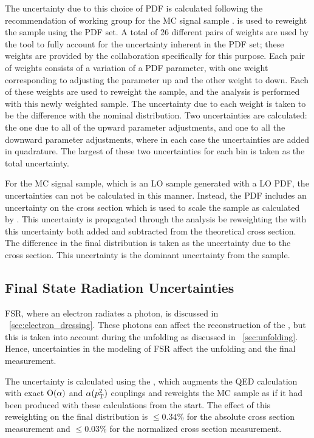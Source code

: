 The uncertainty due to this choice of PDF is calculated following the
recommendation of \PDFforLHC working group for the \POWHEG MC signal sample
\cite{botje_2011}. \PDFWeightProducer is used to reweight the \POWHEG sample
using the \CTten PDF set. A total of \num{26} different pairs of weights are
used by the tool to fully account for the uncertainty inherent in the PDF set;
these weights are provided by the \CTten collaboration specifically for this
purpose. Each pair of weights consists of a variation of a PDF parameter, with
one weight corresponding to adjusting the parameter up and the other weight to
down. Each of these weights are used to reweight the \POWHEG sample, and the
analysis is performed with this newly weighted sample. The uncertainty due to
each weight is taken to be the difference with the nominal \phistar
distribution. Two uncertainties are calculated: the one due to all of the
upward parameter adjustments, and one to all the downward parameter
adjustments, where in each case the uncertainties are added in quadrature. The
largest of these two uncertainties for each \phistar bin is taken as the total
uncertainty.

For the \MADGRAPH MC signal sample, which is an LO sample generated with a LO
PDF, the uncertainties can not be calculated in this manner. Instead, the PDF
includes an uncertainty on the cross section which is used to scale the sample
as calculated by \FEWZ. This uncertainty is propagated through the analysis be
reweighting the \MADGRAPH with this uncertainty both added and subtracted from
the theoretical cross section. The difference in the final \phistar
distribution is taken as the uncertainty due to the \FEWZ cross section. This
uncertainty is the dominant uncertainty from the \MADGRAPH sample.

\subsection{Final State Radiation Uncertainties}
\label{ssec:fsr_uncertainties}

FSR, where an electron radiates a photon, is discussed in
\SEC~\ref{sec:electron_dressing}. These photons can affect the reconstruction
of the \Z, but this is taken into account during the unfolding as discussed in
\SEC~\ref{sec:unfolding}. Hence, uncertainties in the modeling of FSR affect
the unfolding and the final measurement.

The uncertainty is calculated using the \FSRWeightProducer, which augments the
\PYTHIA QED calculation with exact $\operatorname{O}\!\left( \alpha \right)$ and $\alpha(p_{\mathrm{T}}^{2})$
couplings and reweights the MC sample as if it had been produced with these
calculations from the start. The effect of this reweighting on the final
\phistar distribution is $\le 0.34\%$ for the absolute cross section
measurement and $\le 0.03\%$ for the normalized cross section measurement.

